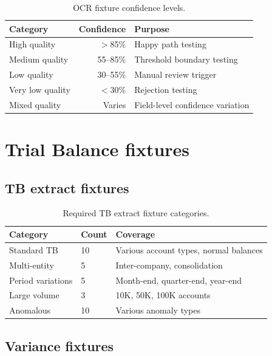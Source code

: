 \documentclass[12pt,a4paper,twoside]{report}
\begin{document}
\begin{table}[htbp]
\centering
\caption{OCR fixture confidence levels.}
\label{tab:ocr-fixtures}
\footnotesize
\begin{tabularx}{\linewidth}{@{}l r X@{}}
\toprule
\textbf{Category} & \textbf{Confidence} & \textbf{Purpose} \\ \midrule
High quality & $>$85\% & Happy path testing \\
Medium quality & 55--85\% & Threshold boundary testing \\
Low quality & 30--55\% & Manual review trigger \\
Very low quality & $<$30\% & Rejection testing \\
Mixed quality & Varies & Field-level confidence variation \\
\bottomrule
\end{tabularx}
\end{table}

\section{Trial Balance fixtures}

\subsection{TB extract fixtures}

\begin{table}[htbp]
\centering
\caption{Required TB extract fixture categories.}
\label{tab:tb-fixtures}
\footnotesize
\begin{tabularx}{\linewidth}{@{}l l X@{}}
\toprule
\textbf{Category} & \textbf{Count} & \textbf{Coverage} \\ \midrule
Standard TB & 10 & Various account types, normal balances \\
Multi-entity & 5 & Inter-company, consolidation \\
Period variations & 5 & Month-end, quarter-end, year-end \\
Large volume & 3 & 10K, 50K, 100K accounts \\
Anomalous & 10 & Various anomaly types \\
\bottomrule
\end{tabularx}
\end{table}

\subsection{Variance fixtures}
\end{document}
